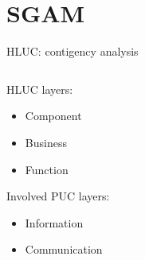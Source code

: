  \section{SGAM}
  \begin{frame}{HLUC: contigency analysis}

    \begin{columns}

      \begin{column}{0.3\textwidth}
        HLUC layers:
        \begin{itemize}
          \item Component
            \item Business
              \item Function
        \end{itemize}
        Involved PUC layers:
        \begin{itemize}
          \item Information
            \item Communication
        \end{itemize}
      \end{column}

      \begin{column}{0.68\textwidth}


        \begin{table}[!htb]\centering\footnotesize




\end{table}
\end{column}
\end{columns}
\end{frame}

